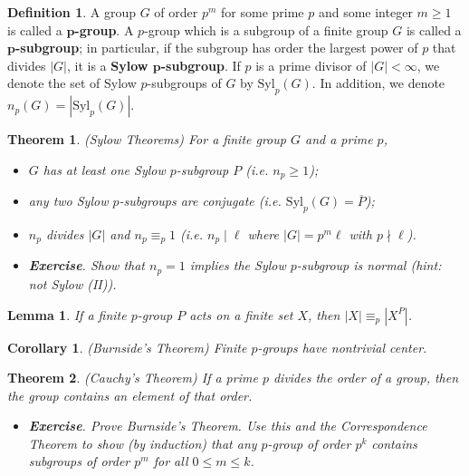 \documentclass[11pt]{amsart}
\newtheorem*{theorem*}{Theorem}
\newtheorem*{lemma*}{Lemma}
\newtheorem*{corollary*}{Corollary}
\theoremstyle{definition}
\newtheorem*{definition*}{Definition}
\renewcommand\geq{\geqslant}
\renewcommand\leq{\leqslant}
\renewcommand\:{\colon}
\renewcommand\bar[1]{\overline{#1}}
\newcommand{\1}{\mathds{1}}
\newcommand{\Syl}{\text{Syl}}
\newcommand{\exc}[1]{\vspace{-2.5pt}\begin{itemize}[leftmargin=15pt]\item[$\RHD$] \textit{\textbf{Exercise}. #1}\end{itemize}}
\begin{document}
\begin{definition*}
	A group $G$ of order $p^m$ for some prime $p$ and some integer $m \geq 1$ is called a \textbf{$\boldsymbol{p}$-group}. A $p$-group which is a subgroup of a finite group $G$ is called a \textbf{$\boldsymbol{p}$-subgroup}; in particular, if the subgroup has order the largest power of $p$ that divides $|G|$, it is a \textbf{Sylow $\boldsymbol{p}$-subgroup}. If $p$ is a prime divisor of $|G| < \infty$, we denote the set of Sylow $p$-subgroups of $G$ by $\Syl_p(G)$. In addition, we denote $n_p(G) = |\Syl_p(G)|$. 
\end{definition*}


\begin{theorem*}
	\textnormal{(Sylow Theorems)} For a finite group $G$ and a prime $p$,
	\begin{itemize}[leftmargin=24.5pt]\setlength\itemsep{0pt}
		\item[\textnormal{(I)}] $G$ has at least one Sylow $p$-subgroup $P$ \textnormal{(}i.e. $n_p \geq 1$\textnormal{)};
		\item[\textnormal{(II)}] any two Sylow $p$-subgroups are conjugate \textnormal{(}i.e. $\Syl_p(G) = \bar{P}$\textnormal{)};
		\item[\textnormal{(III)}] $n_p$ divides $|G|$ and $n_p \equiv_p 1$ \textnormal{(}i.e. $n_p \mid \ell$ where $|G| = p^m\ell$ with $p \nmid \ell$\textnormal{)}.
	\end{itemize}
\end{theorem*}

\exc{Show that $n_p = 1$ implies the Sylow $p$-subgroup is normal \textnormal{(}hint: not \textnormal{Sylow (II)}\textnormal{)}.}

\begin{lemma*}
	If a finite $p$-group $P$ acts on a finite set $X$, then $|X| \equiv_p |X^P|$.
\end{lemma*} 

\begin{corollary*}
	\textnormal{(Burnside's Theorem)} Finite $p$-groups have nontrivial center.
\end{corollary*}

\begin{theorem*}
	\textnormal{(Cauchy's Theorem)} If a prime $p$ divides the order of a group, then the group contains an element of that order.
\end{theorem*}

\exc{Prove Burnside's Theorem. Use this and the Correspondence Theorem to show \textnormal{(}by induction\textnormal{)} that any $p$-group of order $p^k$ contains subgroups of order $p^m$ for all $0 \leq m \leq k$.}
\end{document}
